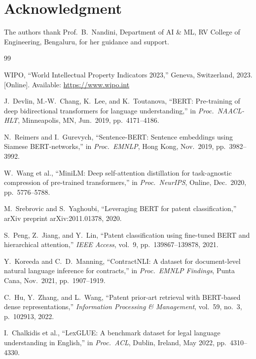 \documentclass[conference]{IEEEtran}
\begin{document}
\section*{Acknowledgment}
The authors thank Prof.\ B.\ Nandini, Department of AI \& ML, RV
College of Engineering, Bengaluru, for her guidance and support.

\begin{thebibliography}{99}

WIPO, ``World Intellectual Property Indicators 2023,'' Geneva,
Switzerland, 2023. [Online]. Available: \url{https://www.wipo.int}

J.\ Devlin, M.-W.\ Chang, K.\ Lee, and K.\ Toutanova,
``BERT: Pre-training of deep bidirectional transformers for language
understanding,'' in \textit{Proc.\ NAACL-HLT}, Minneapolis, MN,
Jun.\ 2019, pp.\ 4171--4186.

N.\ Reimers and I.\ Gurevych,
``Sentence-BERT: Sentence embeddings using Siamese BERT-networks,''
in \textit{Proc.\ EMNLP}, Hong Kong, Nov.\ 2019, pp.\ 3982--3992.

W.\ Wang et al.,
``MiniLM: Deep self-attention distillation for task-agnostic compression
of pre-trained transformers,''
in \textit{Proc.\ NeurIPS}, Online, Dec.\ 2020, pp.\ 5776--5788.

M.\ Srebrovic and S.\ Yaghoubi,
``Leveraging BERT for patent classification,''
arXiv preprint arXiv:2011.01378, 2020.

S.\ Peng, Z.\ Jiang, and Y.\ Lin,
``Patent classification using fine-tuned BERT and hierarchical
attention,'' \textit{IEEE Access}, vol.\ 9,
pp.\ 139867--139878, 2021.

Y.\ Koreeda and C.\ D.\ Manning,
``ContractNLI: A dataset for document-level natural language inference
for contracts,''
in \textit{Proc.\ EMNLP Findings}, Punta Cana, Nov.\ 2021,
pp.\ 1907--1919.

C.\ Hu, Y.\ Zhang, and L.\ Wang,
``Patent prior-art retrieval with BERT-based dense representations,''
\textit{Information Processing \& Management}, vol.\ 59, no.\ 3,
p.\ 102913, 2022.

I.\ Chalkidis et al.,
``LexGLUE: A benchmark dataset for legal language understanding
in English,''
in \textit{Proc.\ ACL}, Dublin, Ireland, May 2022, pp.\ 4310--4330.


\end{thebibliography}
\end{document}
